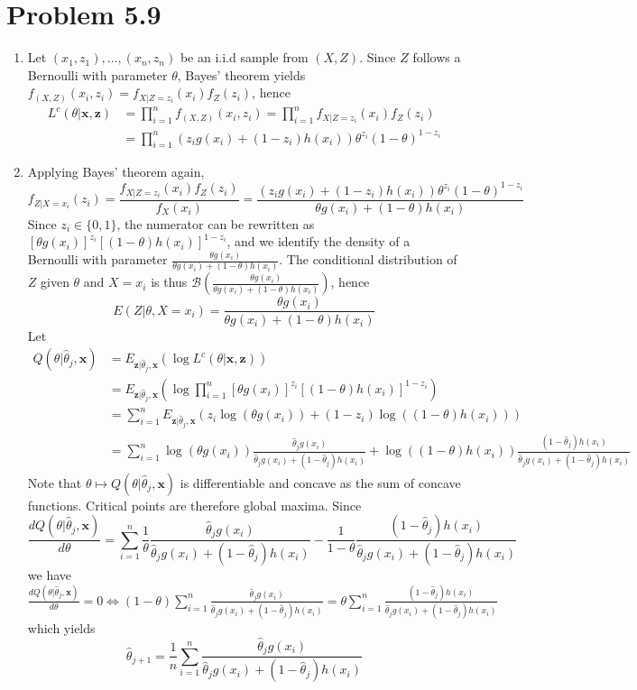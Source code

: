 \documentclass[a4paper,11pt]{article}
\begin{document}
\section*{Problem 5.9}
\begin{enumerate}[label=(\alph*)]
  \item Let $(x_1,z_1),\ldots,(x_n,z_n)$ be an i.i.d sample from $(X,Z)$. Since $Z$ follows a Bernoulli with parameter $\theta$, Bayes' theorem yields $f_{(X,Z)}(x_i,z_i) = f_{X|Z=z_i}(x_i)f_Z(z_i)$, hence $$\begin{aligned}
  L^c(\theta|\mathbf x, \mathbf z) &= \prod_{i=1}^n f_{(X,Z)}(x_i,z_i) = \prod_{i=1}^n  f_{X|Z=z_i}(x_i)f_Z(z_i)\\
  &= \prod_{i=1}^n (z_ig(x_i)+(1-z_i)h(x_i))\theta^{z_i} (1-\theta)^{1-z_i}
  \end{aligned}
  $$

  \item Applying Bayes' theorem again, $$\displaystyle f_{Z|X=x_i}(z_i) = \frac{f_{X|Z=z_i}(x_i)f_Z(z_i)}{f_X(x_i)} = \frac{(z_ig(x_i)+(1-z_i)h(x_i))\theta^{z_i} (1-\theta)^{1-z_i}}{\theta g(x_i) + (1-\theta)h(x_i)}$$ Since $z_i\in \{0,1\}$, the numerator can be rewritten as $[\theta g(x_i)]^{z_i}[(1-\theta) h(x_i)]^{1-z_i}$, and we identify the density of a Bernoulli with parameter $\displaystyle \frac{\theta g(x_i)}{\theta g(x_i) + (1-\theta)h(x_i)}$. The conditional distribution of $Z$ given $\theta$ and $X=x_i$ is thus $\mathcal B(\frac{\theta g(x_i)}{\theta g(x_i) + (1-\theta)h(x_i)})$, hence $$E(Z|\theta, X=x_i)= \frac{\theta g(x_i)}{\theta g(x_i) + (1-\theta)h(x_i)}$$
  Let $$\begin{aligned}
  Q(\theta|\hat \theta_j, \mathbf x) &= E_{\mathbf{z}|\hat \theta_j, \mathbf x}(\log L^c(\theta|\mathbf x, \mathbf z))\\
  &= E_{\mathbf{z}|\hat \theta_j, \mathbf x} \left(\log \prod_{i=1}^n [\theta g(x_i)]^{z_i}[(1-\theta) h(x_i)]^{1-z_i} \right)\\
  &= \sum_{i=1}^n E_{\mathbf{z}|\hat \theta_j, \mathbf x}\left( z_i \log(\theta g(x_i)) + (1-z_i)\log((1-\theta) h(x_i)) \right)\\
  &= \sum_{i=1}^n \log(\theta g(x_i)) \frac{\hat\theta_j g(x_i)}{\hat\theta_j g(x_i) + (1-\hat\theta_j)h(x_i)} + \log((1-\theta) h(x_i)) \frac{(1-\hat\theta_j)h(x_i)}{\hat\theta_j g(x_i) + (1-\hat\theta_j)h(x_i)}
  \end{aligned}
  $$
  Note that $\theta \mapsto Q(\theta|\hat \theta_j, \mathbf x)$ is differentiable and concave as the sum of concave functions. Critical points are therefore global maxima. Since $$\frac{d Q(\theta|\hat \theta_j, \mathbf x)}{d\theta} = \sum_{i=1}^n \frac{1}{\theta}\frac{\hat\theta_j g(x_i)}{\hat\theta_j g(x_i)+ (1-\hat\theta_j)h(x_i)} - \frac{1}{1-\theta}\frac{(1-\hat\theta_j)h(x_i)}{\hat\theta_j g(x_i) + (1-\hat\theta_j)h(x_i)}$$
  we have $\displaystyle \frac{d Q(\theta|\hat \theta_j, \mathbf x)}{d\theta} = 0 \iff (1-\theta)\sum_{i=1}^n\frac{\hat\theta_j g(x_i)}{\hat\theta_j g(x_i)+ (1-\hat\theta_j)h(x_i)} = \theta  \sum_{i=1}^n\frac{(1-\hat\theta_j)h(x_i)}{\hat\theta_j g(x_i) + (1-\hat\theta_j)h(x_i)}$
  which yields $$\hat \theta_{j+1} = \frac 1n \sum_{i=1}^n\frac{\hat\theta_j g(x_i)}{\hat\theta_j g(x_i)+ (1-\hat\theta_j)h(x_i)}$$


\end{enumerate}
\end{document}
